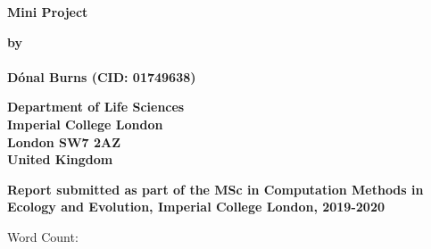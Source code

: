\documentclass[a4paper]{article}
\newcommand\wordcount{}
\numberwithin{equation}{section}
\begin{document}
	\begin{titlepage}
		\thispagestyle{empty}
		\null\vskip0.2in
		\begin{center}
		\LARGE{{\bf 
		Mini Project}}
		\end{center}

		\vspace{0.5cm}

		\begin{center}
		{\Large {\bf by}}\\
		\mbox{} \\
		{\Large {\bf D\'onal Burns (CID: 01749638)}}
		\end{center}

		\vspace{1cm}

		\begin{center}
		\large{\bf{Department of Life Sciences \\ Imperial College London \\
		London SW7 2AZ \\ United Kingdom}}
		\end{center}


		\vspace{1.5cm}

		\begin{figure}[H]
		\end{figure}

		\vspace{1.5cm}

		\begin{center}
		\large{\bf{Report submitted as part of the MSc in Computation Methods in Ecology and Evolution, Imperial College London, 2019-2020}}
		\end{center}

		\vspace{2cm}
		
		\begin{center}
		\large{Word Count: \wordcount}
		\end{center}


\end{titlepage}


\setcounter{tocdepth}{4}
\tableofcontents
\newpage

\fancyhead{}
\fancyfoot{}
\pagestyle{fancy} 
\fancyhead[RO,LE]{\sffamily\small \thepage}
\fancyhead[LO,RE]{\sffamily\small \nouppercase{\rightmark}}
\renewcommand{\headrulewidth}{0.4pt}
\renewcommand{\footrulewidth}{0.0pt}
\end{document}
